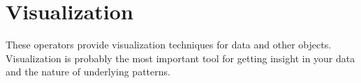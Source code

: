 \section{Visualization}

These operators provide visualization techniques for data and other
\rapidminer objects. Visualization is probably the most important tool for
getting insight in your data and the nature of underlying patterns.
